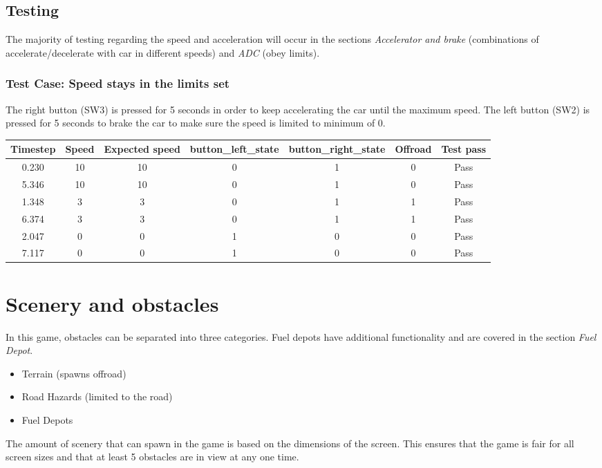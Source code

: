 \documentclass{article}
\begin{document}
\subsection*{Testing}
The majority of testing regarding the speed and acceleration will occur in the sections \emph{Accelerator and brake} (combinations of accelerate/decelerate with car in different speeds) and \emph{ADC} (obey limits). 
\subsubsection*{Test Case: Speed stays in the limits set}
The right button (SW3) is pressed for 5 seconds in order to keep accelerating the car until the maximum speed. The left button (SW2) is pressed for 5 seconds to brake the car to make sure the speed is limited to minimum of 0.
\begin{center}
\begin{tabular}{ c c c c c c c }
Timestep	& Speed	& Expected speed	&  button\_left\_state	& button\_right\_state	& Offroad	& Test pass	\\ \hline
0.230		& 10		& 10			& 0				& 1				& 0		& Pass	\\
5.346		& 10		& 10			& 0				& 1				& 0		& Pass	\\
1.348		& 3		& 3			& 0				& 1				& 1		& Pass	\\
6.374		& 3		& 3			& 0				& 1				& 1		& Pass	\\
2.047 		& 0		& 0			& 1 				& 0 				& 0  		& Pass	\\ 
7.117		& 0		& 0			& 1				& 0				& 0		& Pass	\\ \hline
\end{tabular}
\end{center}

\clearpage

\section{Scenery and obstacles}
In this game, obstacles can be separated into three categories.  Fuel depots have additional functionality and are covered in the section \emph{Fuel Depot}. 
\begin{itemize}
 	\item Terrain (spawns offroad)
 	\item Road Hazards (limited to the road)
	\item Fuel Depots
\end{itemize}
The amount of scenery that can spawn in the game is based on the dimensions of the screen. This ensures that the game is fair for all screen sizes and that at least 5 obstacles are in view at any one time.
\end{document}
